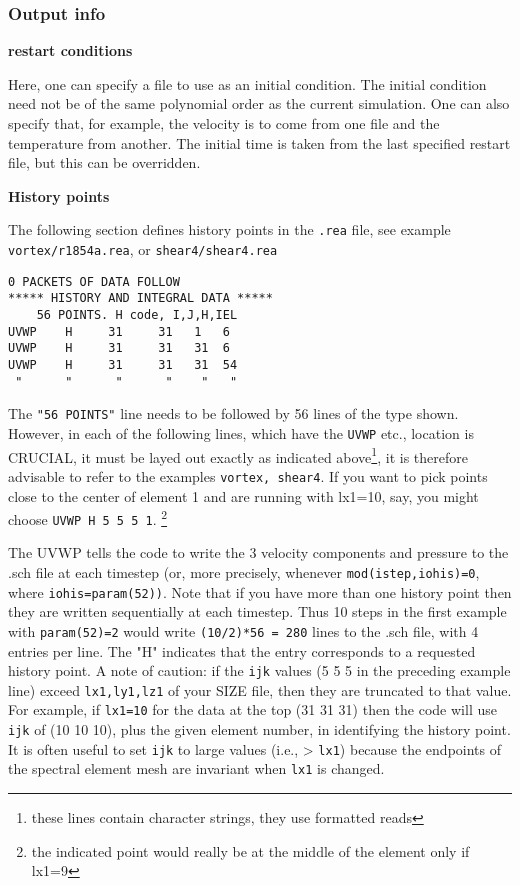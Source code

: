 \subsubsection*{ Output info} 
\begin{description}
\item{\bf restart conditions} 

     Here, one can specify a file to use as an initial condition.
     The initial condition need not be of the same polynomial order
     as the current simulation.   One can also specify that, for example,
     the velocity is to come from one file and the temperature from another.
     The initial time is taken from the last specified restart file, but 
     this can be overridden.
\item{\bf History points}

The following section defines history points in the {\tt .rea} file, see example {\tt vortex/r1854a.rea}, or {\tt shear4/shear4.rea}
\begin{verbatim}
0 PACKETS OF DATA FOLLOW
***** HISTORY AND INTEGRAL DATA *****
    56 POINTS. H code, I,J,H,IEL 
UVWP    H     31     31   1   6
UVWP    H     31     31   31  6
UVWP    H     31     31   31  54
 "      "      "      "    "   "
\end{verbatim}

The {\tt "56 POINTS"} line needs to be followed by 56 lines of the type shown. However, in each of the following lines, which have the {\tt UVWP} etc., location is CRUCIAL, it
must be layed out exactly as indicated above\footnote{these lines contain character strings, they use formatted reads}, it is therefore advisable to refer to the examples {\tt vortex, shear4}.  If you want to pick points close to the center of element 1 and are running with lx1=10, say, you might choose {\tt UVWP H 5 5 5 1}. \footnote{the indicated point would really be at the middle of the element only if lx1=9}

The UVWP tells the code to write the 3 velocity components and pressure to the .sch file at
each timestep (or, more precisely, whenever {\tt mod(istep,iohis)=0}, where {\tt iohis=param(52))}.
Note that if you have more than one history point then they are written sequentially at each
timestep. Thus 10 steps in the first example with {\tt param(52)=2} would write {\tt (10/2)*56 = 280}
lines to the .sch file, with 4 entries per line. The "H" indicates that the entry corresponds to a requested history point. A note of caution: if the {\tt ijk} values (5 5 5 in the preceding example line) exceed {\tt lx1,ly1,lz1} of your SIZE file, then they are truncated to that value. For example, if {\tt lx1=10} for the data at the top (31 31 31) then the code will use {\tt ijk} of (10 10 10), plus the given element number, in identifying the history point. It is often useful to set {\tt ijk} to large values (i.e., > {\tt lx1}) because the endpoints of the spectral element mesh are invariant when {\tt lx1} is changed. 


\end{description}
